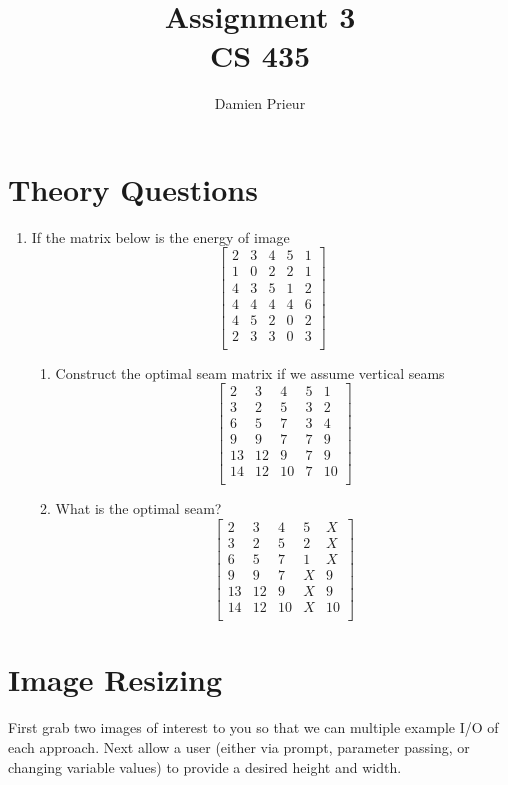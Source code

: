 \documentclass{article}
\author{Damien Prieur}
\title{Assignment 3 \\ CS 435}
\date{}
\begin{document}
\maketitle

\section{Theory Questions}
\begin{enumerate}
\item If the matrix below is the energy of image
$$
\begin{bmatrix}
2&	3&	4&	5&	1\\
1&	0&	2&	2&	1\\
4&	3&	5&	1&	2\\
4&	4&	4&	4&	6\\
4&	5&	2&	0&	2\\
2&	3&	3&	0&	3\\
\end{bmatrix}
$$

\begin{enumerate}
\item Construct the optimal seam matrix if we assume vertical seams
$$
\begin{bmatrix}
2&	3&	4&	5&	1\\
3&	2&	5&	3&	2\\
6&	5&	7&	3&	4\\
9&	9&	7&	7&	9\\
13&	12&	9&	7&	9\\
14&	12&	10&	7&	10\\
\end{bmatrix}
$$
\item What is the optimal seam?
$$
\begin{bmatrix}
2&	3&	4&	5&	X\\
3&	2&	5&	2&	X\\
6&	5&	7&	1&	X\\
9&	9&	7&	X&	9\\
13&	12&	9&	X&	9\\
14&	12&	10&	X&	10\\
\end{bmatrix}
$$
\end{enumerate}
\end{enumerate}

\newpage
\section{Image Resizing}
First grab two images of interest to you so that we can multiple example I/O of each approach.   Next allow a user (either via prompt, parameter passing, or changing variable values) to provide a desired height and width.\\ 
\end{document}
